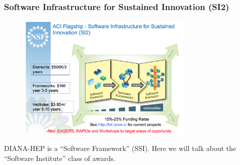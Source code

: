 \begin{frame}
\frametitle{Software Infrastructure for Sustained Innovation (SI2)}

\begin{figure}[htbp]
\begin{center}
\includegraphics[width=0.75\textwidth]{images/ramnath-si2-pi-meeting-2016.png}
\label{fig:nsfsi2}
\end{center}
\end{figure}

DIANA-HEP is a ``Software Framework'' (SSI).  Here we will talk about the ``Software Institute'' class of awards.

\end{frame}


